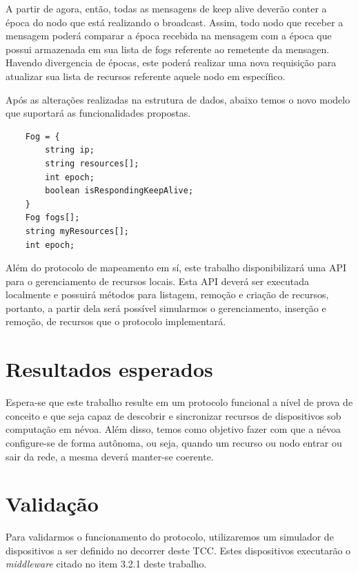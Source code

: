 A partir de agora, então, todas as mensagens de keep alive deverão conter a época do nodo que está realizando o broadcast.
Assim, todo nodo que receber a mensagem poderá comparar a época recebida na mensagem com a época que possui armazenada em sua lista de fogs referente ao remetente da mensagen.
Havendo divergencia de épocas, este poderá realizar uma nova requisição para atualizar sua lista de recursos referente aquele nodo em específico.

Após as alterações realizadas na estrutura de dados, abaixo temos o novo modelo que suportará as funcionalidades propostas.
\begin{verbatim}
    Fog = {
        string ip;
        string resources[];
        int epoch;
        boolean isRespondingKeepAlive;
    }
    Fog fogs[];
    string myResources[];
    int epoch;
\end{verbatim}

Além do protocolo de mapeamento em sí, este trabalho disponibilizará uma API para o gerenciamento de recursos locais.
Esta API deverá ser executada localmente e possuirá métodos para listagem, remoção e criação de recursos, portanto, a partir dela será possível
simularmos o gerenciamento, inserção e remoção, de recursos que o protocolo implementará.


\section{Resultados esperados}

Espera-se que este trabalho resulte em um protocolo funcional a nível de prova de conceito e que seja capaz de descobrir e sincronizar recursos de dispositivos sob computação em névoa.
Além disso, temos como objetivo fazer com que a névoa configure-se de forma autônoma, ou seja, quando um recurso ou nodo entrar ou sair da rede, a mesma deverá manter-se coerente.

\section{Validação}




Para validarmos o funcionamento do protocolo, utilizaremos um simulador de dispositivos a ser definido no decorrer deste TCC.
Estes dispositivos executarão o \textit{middleware} citado no item 3.2.1 deste trabalho.

